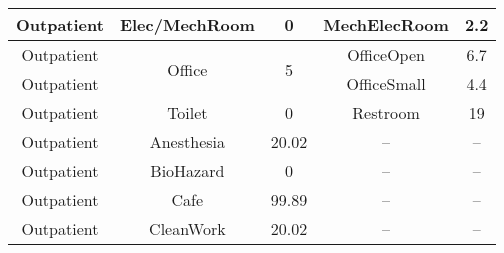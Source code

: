 \begin{table}
\begin{tabular}{|c|c|c|c|c|}
Outpatient             & Elec/MechRoom           & 0                                                                                                             & MechElecRoom                      & 2.2                                                                                                            \\ \hline
Outpatient             & \multirow{2}{*}{Office} & \multirow{2}{*}{5}                                                                                            & OfficeOpen                        & 6.7                                                                                                            \\ \cline{1-1} \cline{4-5} 
Outpatient             &                         &                                                                                                               & OfficeSmall                       & 4.4                                                                                                            \\ \hline
Outpatient             & Toilet                  & 0                                                                                                             & Restroom                          & 19                                                                                                             \\ \hline
Outpatient             & Anesthesia              & 20.02                                                                                                         & --                                & --                                                                                                             \\ \hline
Outpatient             & BioHazard               & 0                                                                                                             & --                                & --                                                                                                             \\ \hline
Outpatient             & Cafe                    & 99.89                                                                                                         & --                                & --                                                                                                             \\ \hline
Outpatient             & CleanWork               & 20.02                                                                                                         & --                                & --                                                                                                             \\ \hline

\end{tabular}
\end{table}
